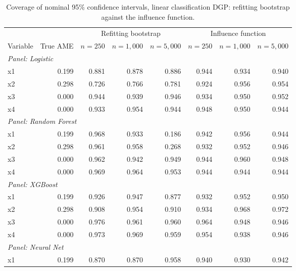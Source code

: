 \documentclass[12pt]{article}
\begin{document}
	\begin{table}[htbp]
		\centering
		\small
		\begin{threeparttable}
			\caption{Coverage of nominal 95\% confidence intervals, linear classification DGP: refitting bootstrap against the influence function.}
			\label{tab:sim3_coverage_classification_linear}
			\begin{tabular}{lrrrrrrr}
				\toprule
				& & \multicolumn{3}{c}{Refitting bootstrap} & \multicolumn{3}{c}{Influence function} \\
				\cmidrule(lr){3-5} \cmidrule(lr){6-8}
				Variable & True AME & $n=250$ & $n=1,000$ & $n=5,000$ & $n=250$ & $n=1,000$ & $n=5,000$ \\
				\midrule
				\multicolumn{8}{l}{\textit{Panel: Logistic}} \\
				\quad x1 & 0.199 & 0.881 & 0.878 & 0.886 & 0.944 & 0.934 & 0.940 \\
				\quad x2 & 0.298 & 0.726 & 0.766 & 0.781 & 0.924 & 0.956 & 0.954 \\
				\quad x3 & 0.000 & 0.944 & 0.939 & 0.946 & 0.934 & 0.950 & 0.952 \\
				\quad x4 & 0.000 & 0.933 & 0.954 & 0.944 & 0.948 & 0.950 & 0.944 \\
				\midrule
				\multicolumn{8}{l}{\textit{Panel: Random Forest}} \\
				\quad x1 & 0.199 & 0.968 & 0.933 & 0.186 & 0.942 & 0.956 & 0.944 \\
				\quad x2 & 0.298 & 0.961 & 0.958 & 0.268 & 0.932 & 0.952 & 0.946 \\
				\quad x3 & 0.000 & 0.962 & 0.942 & 0.949 & 0.944 & 0.960 & 0.948 \\
				\quad x4 & 0.000 & 0.969 & 0.964 & 0.953 & 0.944 & 0.944 & 0.944 \\
				\midrule
				\multicolumn{8}{l}{\textit{Panel: XGBoost}} \\
				\quad x1 & 0.199 & 0.926 & 0.947 & 0.877 & 0.932 & 0.952 & 0.950 \\
				\quad x2 & 0.298 & 0.908 & 0.954 & 0.910 & 0.934 & 0.968 & 0.972 \\
				\quad x3 & 0.000 & 0.976 & 0.961 & 0.960 & 0.964 & 0.948 & 0.946 \\
				\quad x4 & 0.000 & 0.973 & 0.969 & 0.959 & 0.954 & 0.938 & 0.946 \\
				\midrule
				\multicolumn{8}{l}{\textit{Panel: Neural Net}} \\
				\quad x1 & 0.199 & 0.870 & 0.870 & 0.958 & 0.940 & 0.930 & 0.942 \\

\end{tabular}
\end{threeparttable}
\end{table}
\end{document}
